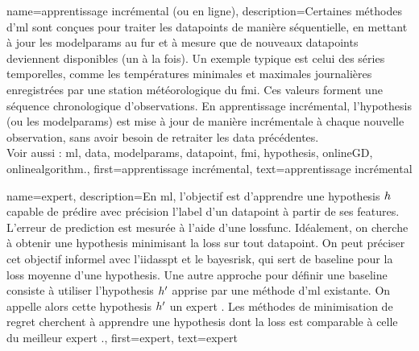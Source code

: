 {
	name={apprentissage incrémental (ou en ligne)},
	description={Certaines méthodes d’\gls{ml}  sont conçues pour traiter les \glspl{datapoint} 
		de manière séquentielle, en mettant à jour les \gls{modelparams} au fur et à mesure que 
		de nouveaux \glspl{datapoint} deviennent disponibles (un à la fois). 
		Un exemple typique est celui des séries temporelles, comme les températures minimales et maximales
		journalières enregistrées par une station météorologique du \gls{fmi}. Ces valeurs forment 
		une séquence chronologique d’observations. En apprentissage incrémental, l’\gls{hypothesis} (ou les \gls{modelparams}) 
		est mise à jour de manière incrémentale à chaque nouvelle observation, sans avoir besoin de 
		retraiter les \gls{data} précédentes. \\
		Voir aussi : \gls{ml}, \gls{data}, \gls{modelparams}, \gls{datapoint}, \gls{fmi}, \gls{hypothesis}, \gls{onlineGD}, \gls{onlinealgorithm}.},
	first={apprentissage incrémental},
	text={apprentissage incrémental}
}

{
	name={expert},
	description={En \gls{ml}, l'objectif est d'apprendre une \gls{hypothesis} $h$ capable de prédire avec précision l'\gls{label} 
		d'un \gls{datapoint} à partir de ses \glspl{feature}. L'erreur de \gls{prediction} est mesurée à l'aide d'une \gls{lossfunc}. 
		Idéalement, on cherche à obtenir une \gls{hypothesis} minimisant la \gls{loss} sur tout \gls{datapoint}. 
		On peut préciser cet objectif informel avec l'\gls{iidasspt} et le \gls{bayesrisk}, qui sert de \gls{baseline} pour la \gls{loss} moyenne d'une \gls{hypothesis}. 
		Une autre approche pour définir une \gls{baseline} consiste à utiliser l'\gls{hypothesis} $h'$ apprise par une méthode d’\gls{ml} existante. 
		On appelle alors cette \gls{hypothesis} $h'$ un expert \cite{PredictionLearningGames}. 
		Les méthodes de minimisation de \gls{regret} cherchent à apprendre une \gls{hypothesis} dont la \gls{loss} est comparable à celle du meilleur expert \cite{PredictionLearningGames,HazanOCO}.},
	first={expert},
	text={expert}
}

